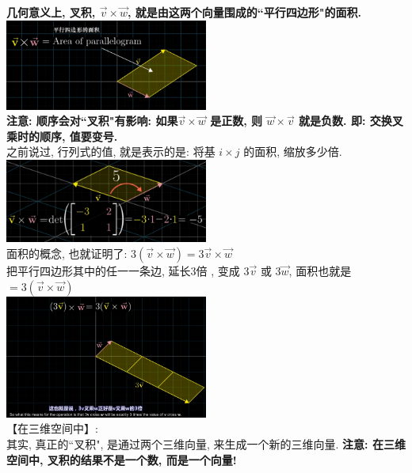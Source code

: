 \documentclass[UTF8]{ctexart}
\begin{document}
\textbf{几何意义上, 叉积, $\vec{v} \times \vec{w}$, 就是由这两个向量围成的``平行四边形"的面积.} \\
\includegraphics[width=0.5\textwidth]{img/0073.png}\\

\textbf{注意: 顺序会对``叉积"有影响: 如果$\vec{v} \times \vec{w}$ 是正数, 则 $\vec{w} \times \vec{v}$ 就是负数. 即: 交换叉乘时的顺序, 值要变号.} \\

之前说过, 行列式的值, 就是表示的是: 将基 $i \times j$ 的面积, 缩放多少倍.\\
\includegraphics[width=0.5\textwidth]{img/0074.png}\\

面积的概念, 也就证明了: $3(\vec{v} \times \vec{w}) = 3 \vec{v} \times \vec{w}$\\
把平行四边形其中的任一一条边, 延长3倍 , 变成 $3 \vec{v}$ 或  $3 \vec{w}$, 面积也就是 $= 3 (\vec{v} \times \vec{w})$ \\
\includegraphics[width=0.5\textwidth]{img/0075.png}\\




【在三维空间中】:\\
其实, 真正的``叉积", 是通过两个三维向量, 来生成一个新的三维向量. \textbf{注意: 在三维空间中, 叉积的结果不是一个数, 而是一个向量!} \\
\end{document}

